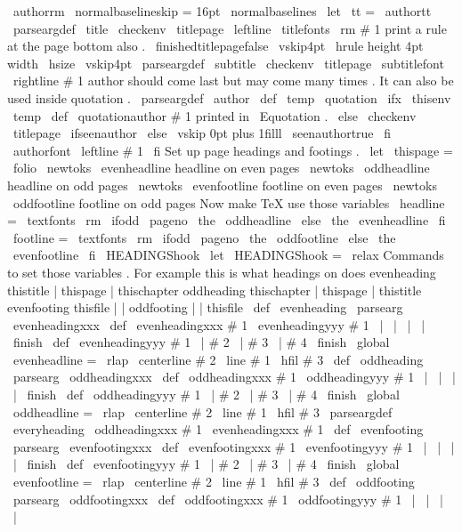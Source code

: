 {{
\
authorrm
\
normalbaselineskip
=
16pt
\
normalbaselines
\
let
\
tt
=
\
authortt
}
\
parseargdef
\
title
{
%
\
checkenv
\
titlepage
\
leftline
{
\
titlefonts
\
rm
#
1
}
%
print
a
rule
at
the
page
bottom
also
.
\
finishedtitlepagefalse
\
vskip4pt
\
hrule
height
4pt
width
\
hsize
\
vskip4pt
}
\
parseargdef
\
subtitle
{
%
\
checkenv
\
titlepage
{
\
subtitlefont
\
rightline
{
#
1
}
}
%
}
%
author
should
come
last
but
may
come
many
times
.
%
It
can
also
be
used
inside
quotation
.
%
\
parseargdef
\
author
{
%
\
def
\
temp
{
\
quotation
}
%
\
ifx
\
thisenv
\
temp
\
def
\
quotationauthor
{
#
1
}
%
printed
in
\
Equotation
.
\
else
\
checkenv
\
titlepage
\
ifseenauthor
\
else
\
vskip
0pt
plus
1filll
\
seenauthortrue
\
fi
{
\
authorfont
\
leftline
{
#
1
}
}
%
\
fi
}
%
%
%
Set
up
page
headings
and
footings
.
\
let
\
thispage
=
\
folio
\
newtoks
\
evenheadline
%
headline
on
even
pages
\
newtoks
\
oddheadline
%
headline
on
odd
pages
\
newtoks
\
evenfootline
%
footline
on
even
pages
\
newtoks
\
oddfootline
%
footline
on
odd
pages
%
Now
make
TeX
use
those
variables
\
headline
=
{
{
\
textfonts
\
rm
\
ifodd
\
pageno
\
the
\
oddheadline
\
else
\
the
\
evenheadline
\
fi
}
}
\
footline
=
{
{
\
textfonts
\
rm
\
ifodd
\
pageno
\
the
\
oddfootline
\
else
\
the
\
evenfootline
\
fi
}
\
HEADINGShook
}
\
let
\
HEADINGShook
=
\
relax
%
Commands
to
set
those
variables
.
%
For
example
this
is
what
headings
on
does
%
evenheading
thistitle
|
thispage
|
thischapter
%
oddheading
thischapter
|
thispage
|
thistitle
%
evenfooting
thisfile
|
|
%
oddfooting
|
|
thisfile
\
def
\
evenheading
{
\
parsearg
\
evenheadingxxx
}
\
def
\
evenheadingxxx
#
1
{
\
evenheadingyyy
#
1
\
|
\
|
\
|
\
|
\
finish
}
\
def
\
evenheadingyyy
#
1
\
|
#
2
\
|
#
3
\
|
#
4
\
finish
{
%
\
global
\
evenheadline
=
{
\
rlap
{
\
centerline
{
#
2
}
}
\
line
{
#
1
\
hfil
#
3
}
}
}
\
def
\
oddheading
{
\
parsearg
\
oddheadingxxx
}
\
def
\
oddheadingxxx
#
1
{
\
oddheadingyyy
#
1
\
|
\
|
\
|
\
|
\
finish
}
\
def
\
oddheadingyyy
#
1
\
|
#
2
\
|
#
3
\
|
#
4
\
finish
{
%
\
global
\
oddheadline
=
{
\
rlap
{
\
centerline
{
#
2
}
}
\
line
{
#
1
\
hfil
#
3
}
}
}
\
parseargdef
\
everyheading
{
\
oddheadingxxx
{
#
1
}
\
evenheadingxxx
{
#
1
}
}
%
\
def
\
evenfooting
{
\
parsearg
\
evenfootingxxx
}
\
def
\
evenfootingxxx
#
1
{
\
evenfootingyyy
#
1
\
|
\
|
\
|
\
|
\
finish
}
\
def
\
evenfootingyyy
#
1
\
|
#
2
\
|
#
3
\
|
#
4
\
finish
{
%
\
global
\
evenfootline
=
{
\
rlap
{
\
centerline
{
#
2
}
}
\
line
{
#
1
\
hfil
#
3
}
}
}
\
def
\
oddfooting
{
\
parsearg
\
oddfootingxxx
}
\
def
\
oddfootingxxx
#
1
{
\
oddfootingyyy
#
1
\
|
\
|
\
|
\
|
}}
